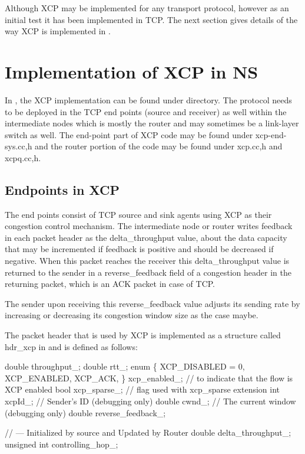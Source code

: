 Although XCP may be implemented for any transport protocol, however as an
initial test it has been implemented in TCP. The next section
gives details of the way XCP is implemented in \ns{}.


\section{Implementation of XCP in NS}
\label{sec:xcp in ns}

In \ns{}, the XCP implementation can be found under  directory. 
The protocol needs to be deployed in the TCP end points (source and
receiver) as well within the intermediate nodes which is mostly the
router and may sometimes be a link-layer switch as well. The end-point
part of XCP code may be found under xcp-end-sys.{cc,h} and the router
portion of the code may be found under xcp.{cc,h} and xcpq.{cc,h}. 

\subsection{Endpoints in XCP}
\label{sec:endpoints}

The end points consist of TCP source and sink agents using XCP as their
congestion control mechanism. The
intermediate node or router writes feedback in each packet header as
the delta\_throughput value, about the data capacity that may be
incremented if feedback is positive and should be decreased if
negative. When this packet reaches the receiver this delta\_throughput
value is returned to the sender in a reverse\_feedback field of a
congestion header in the returning packet, which is an ACK packet in
case of TCP. 
  
The sender upon receiving this reverse\_feedback value adjusts its
sending rate by increasing or decreasing its congestion window size as
the case maybe. 

The packet header that is used by XCP is implemented as a structure
called hdr\_xcp in \ns{} and is defined as follows:
\begin{program}
  double	throughput_;
  double	rtt_;
  enum \{
    XCP_DISABLED = 0,
    XCP_ENABLED,
    XCP_ACK,
  \} 	xcp_enabled_;		// to indicate that the flow is XCP enabled
  bool	xcp_sparse_;    // flag used with xcp_sparse extension
  int	        xcpId_;		// Sender's ID (debugging only)
  double	cwnd_;		// The current window (debugging only) 
  double	reverse_feedback_; 
  
  // --- Initialized by source and Updated by Router 
  double delta_throughput_;
  unsigned int controlling_hop_; 
\end{program}
  
